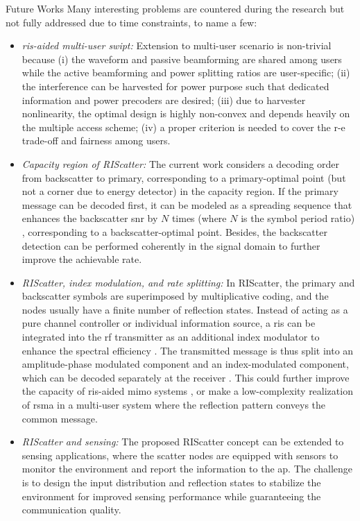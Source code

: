 \begin{section}{Future Works}
	Many interesting problems are countered during the research but not fully addressed due to time constraints, to name a few:
	\begin{itemize}
		\item \emph{\gls{ris}-aided multi-user \gls{swipt}:} Extension to multi-user scenario is non-trivial because (i) the waveform and passive beamforming are shared among users while the active beamforming and power splitting ratios are user-specific; (ii) the interference can be harvested for power purpose such that dedicated information and power precoders are desired; (iii) due to harvester nonlinearity, the optimal design is highly non-convex and depends heavily on the multiple access scheme; (iv) a proper criterion is needed to cover the \gls{r-e} trade-off and fairness among users.
		\item \emph{Capacity region of RIScatter:} The current work considers a decoding order from backscatter to primary, corresponding to a primary-optimal point (but not a corner due to energy detector) in the capacity region.
		If the primary message can be decoded first, it can be modeled as a spreading sequence that enhances the backscatter \gls{snr} by $N$ times (where $N$ is the symbol period ratio) \cite{Long2020a}, corresponding to a backscatter-optimal point.
		Besides, the backscatter detection can be performed coherently in the signal domain to further improve the achievable rate.
		\item \emph{RIScatter, index modulation, and rate splitting:} In RIScatter, the primary and backscatter symbols are superimposed by multiplicative coding, and the nodes usually have a finite number of reflection states. Instead of acting as a pure channel controller or individual information source, a \gls{ris} can be integrated into the \gls{rf} transmitter as an additional index modulator to enhance the spectral efficiency \cite{Basar2020}.
		The transmitted message is thus split into an amplitude-phase modulated component and an index-modulated component, which can be decoded separately at the receiver \cite{Zhong2018}. This could further improve the capacity of \gls{ris}-aided \gls{mimo} systems \cite{Ye2022}, or make a low-complexity realization of \gls{rsma} \cite{Mao2018} in a multi-user system where the reflection pattern conveys the common message.
		\item \emph{RIScatter and sensing:} The proposed RIScatter concept can be extended to sensing applications, where the scatter nodes are equipped with sensors to monitor the environment and report the information to the \gls{ap}. The challenge is to design the input distribution and reflection states to stabilize the environment for improved sensing performance while guaranteeing the communication quality.

\end{itemize}
\end{section}
